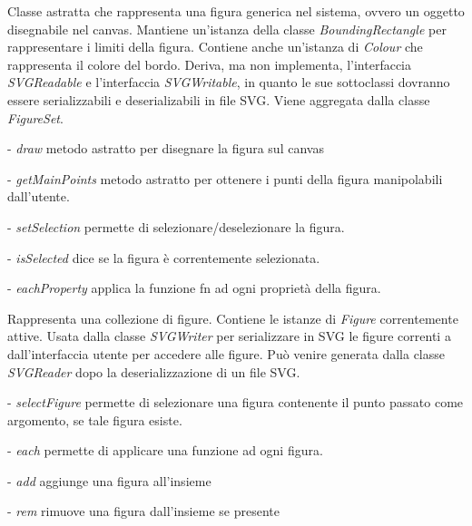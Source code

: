 Classe astratta che rappresenta una figura generica nel sistema, ovvero un oggetto disegnabile nel canvas.
Mantiene un'istanza della classe \textit{BoundingRectangle} per rappresentare i limiti della figura. Contiene anche un'istanza di \textit{Colour} che rappresenta il colore del bordo. Deriva, ma non implementa, l'interfaccia \textit{SVGReadable} e l'interfaccia \textit{SVGWritable}, in quanto le sue sottoclassi dovranno essere serializzabili e deserializabili in file SVG.
Viene aggregata dalla classe \textit{FigureSet}.
\begin{elencopuntato}[\normindent]
\item[-]  \textit{draw} metodo astratto per disegnare la figura sul canvas
\item[-]  \textit{getMainPoints} metodo astratto per ottenere i punti della figura manipolabili dall'utente.
\item[-]  \textit{setSelection} permette di selezionare/deselezionare la figura.
\item[-]  \textit{isSelected} dice se la figura \`e correntemente selezionata.
\item[-]  \textit{eachProperty} applica la funzione fn ad ogni propriet\`a della figura.
\end{elencopuntato}

Rappresenta una collezione di figure.
Contiene le istanze di \textit{Figure} correntemente attive.
Usata dalla classe \textit{SVGWriter} per serializzare in SVG le figure correnti a dall'interfaccia utente per accedere alle figure. Pu\`o venire generata dalla classe \textit{SVGReader} dopo la deserializzazione di un file SVG.
\begin{elencopuntato}[\normindent]
\item[-]  \textit{selectFigure} permette di selezionare una figura contenente il punto passato come argomento, se tale figura esiste.
\item[-]  \textit{each} permette di applicare una funzione ad ogni figura.
\item[-]  \textit{add} aggiunge una figura all'insieme
\item[-]  \textit{rem} rimuove una figura dall'insieme se presente
\end{elencopuntato}

